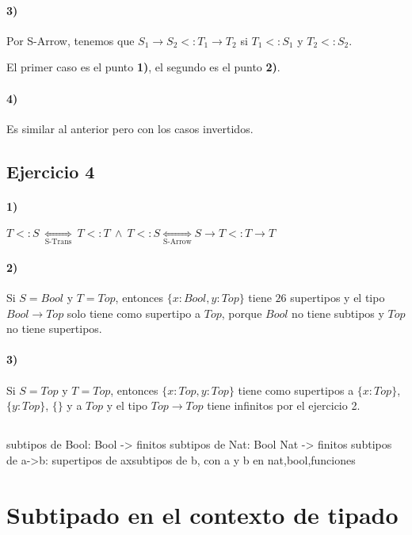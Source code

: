 \documentclass[10pt,a4paper, landscape]{article}
\begin{document}
\begin{multicols}{2}
\paragraph{3)} Por S-Arrow, tenemos que $S_1\to S_2 <: T_1\to T_2$ si $T_1 <: S_1$ y $T_2 <: S_2$. 

El primer caso es el punto \textbf{1)}, el segundo es el punto \textbf{2)}.
\paragraph{4)} Es similar al anterior pero con los casos invertidos.

\subsection{Ejercicio 4}
\paragraph{1)} $T<:S~\underset{\text{S-Trans}}{\iff} ~ T<:T~\land~T<:S \underset{\text{S-Arrow}}{\iff} S\to T <: T\to T$
\paragraph{2)} Si $S = Bool$ y $T = Top$, entonces $\{x:Bool, y:Top\}$ tiene $26$ supertipos y el tipo $Bool\to Top$ solo tiene como supertipo a $Top$, porque $Bool$ no tiene subtipos y $Top$ no tiene supertipos.
\paragraph{3)} Si $S = Top$ y $T = Top$, entonces $\{x:Top, y:Top\}$ tiene como supertipos a $\{x:Top\}$, $\{y:Top\}$, $\{\}$ y a $Top$ y el tipo $Top\to Top$ tiene infinitos por el ejercicio 2.

\subsection{}

subtipos de Bool: {Bool} -> finitos
subtipos de Nat: {Bool} {Nat} -> finitos
subtipos de a->b: {supertipos de a}x{subtipos de b}, con a y b en {nat,bool,funciones}

\end{multicols}



\newpage
\section*{\centering Subtipado en el contexto de tipado}
\end{document}
